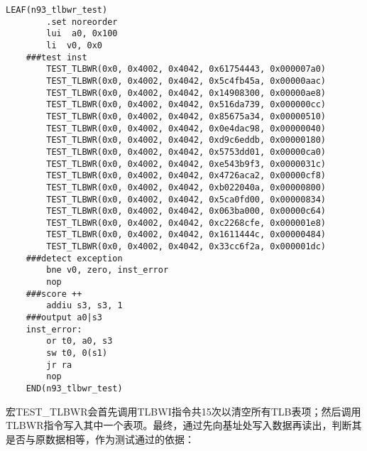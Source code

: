 \begin{enumerate}
    \begin{lstlisting}[caption={n93\_tlbwr.S}, emph={TEST\_TLBWR}]
    LEAF(n93_tlbwr_test)
        .set noreorder
        lui  a0, 0x100
        li  v0, 0x0
    ###test inst
        TEST_TLBWR(0x0, 0x4002, 0x4042, 0x61754443, 0x000007a0)
        TEST_TLBWR(0x0, 0x4002, 0x4042, 0x5c4fb45a, 0x00000aac)
        TEST_TLBWR(0x0, 0x4002, 0x4042, 0x14908300, 0x00000ae8)
        TEST_TLBWR(0x0, 0x4002, 0x4042, 0x516da739, 0x000000cc)
        TEST_TLBWR(0x0, 0x4002, 0x4042, 0x85675a34, 0x00000510)
        TEST_TLBWR(0x0, 0x4002, 0x4042, 0x0e4dac98, 0x00000040)
        TEST_TLBWR(0x0, 0x4002, 0x4042, 0xd9c6eddb, 0x00000180)
        TEST_TLBWR(0x0, 0x4002, 0x4042, 0x5753dd01, 0x00000ca0)
        TEST_TLBWR(0x0, 0x4002, 0x4042, 0xe543b9f3, 0x0000031c)
        TEST_TLBWR(0x0, 0x4002, 0x4042, 0x4726aca2, 0x00000cf8)
        TEST_TLBWR(0x0, 0x4002, 0x4042, 0xb022040a, 0x00000800)
        TEST_TLBWR(0x0, 0x4002, 0x4042, 0x5ca0fd00, 0x00000834)
        TEST_TLBWR(0x0, 0x4002, 0x4042, 0x063ba000, 0x00000c64)
        TEST_TLBWR(0x0, 0x4002, 0x4042, 0xc2268cfe, 0x000001e8)
        TEST_TLBWR(0x0, 0x4002, 0x4042, 0x1611444c, 0x00000484)
        TEST_TLBWR(0x0, 0x4002, 0x4042, 0x33cc6f2a, 0x000001dc)
    ###detect exception
        bne v0, zero, inst_error
        nop
    ###score ++
        addiu s3, s3, 1
    ###output a0|s3
    inst_error:
        or t0, a0, s3
        sw t0, 0(s1)
        jr ra
        nop
    END(n93_tlbwr_test)
    \end{lstlisting}

    宏TEST\_TLBWR会首先调用TLBWI指令共15次以清空所有TLB表项；然后调用TLBWR指令写入其中一个表项。最终，通过先向基址处写入数据再读出，判断其是否与原数据相等，作为测试通过的依据：


\end{enumerate}
